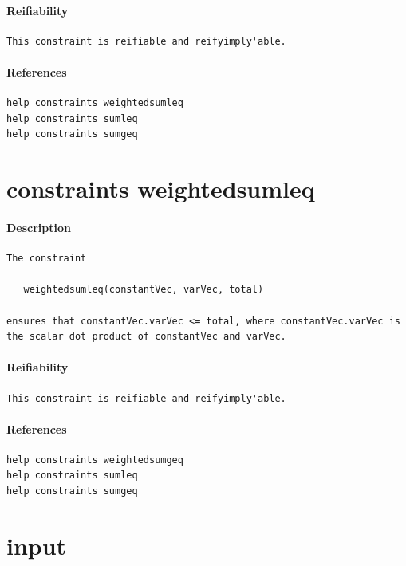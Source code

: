 \documentclass[oneside]{book}
\begin{document}
\paragraph{Reifiability}
{\footnotesize
\begin{verbatim}
This constraint is reifiable and reifyimply'able.
\end{verbatim}
}
\paragraph{References}
{\footnotesize
\begin{verbatim}
help constraints weightedsumleq
help constraints sumleq
help constraints sumgeq
\end{verbatim}
}
\section{constraints weightedsumleq}
\paragraph{Description}
{\footnotesize
\begin{verbatim}
The constraint

   weightedsumleq(constantVec, varVec, total)

ensures that constantVec.varVec <= total, where constantVec.varVec is
the scalar dot product of constantVec and varVec.
\end{verbatim}
}
\paragraph{Reifiability}
{\footnotesize
\begin{verbatim}
This constraint is reifiable and reifyimply'able.
\end{verbatim}
}
\paragraph{References}
{\footnotesize
\begin{verbatim}
help constraints weightedsumgeq
help constraints sumleq
help constraints sumgeq
\end{verbatim}
}
\section{input}
\end{document}
